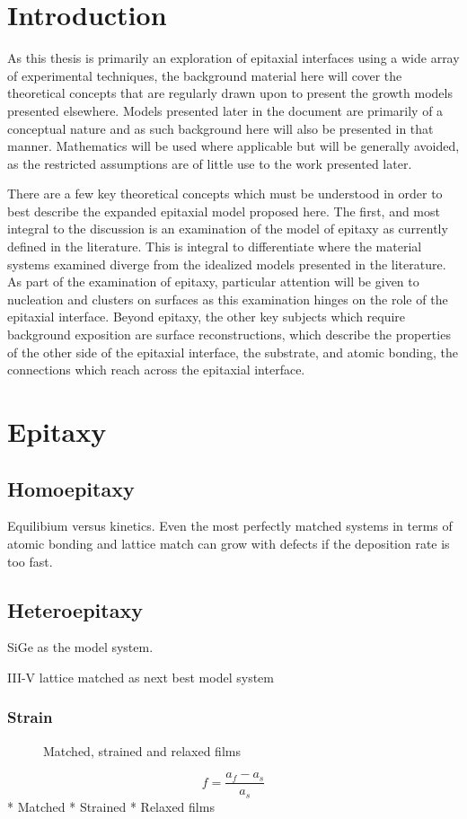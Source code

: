 \section{Introduction}
As this thesis is primarily an exploration of epitaxial interfaces using a wide array of experimental techniques, the background material here will cover the theoretical concepts that are regularly drawn upon to present the growth models presented elsewhere. Models presented later in the document are primarily of a conceptual nature and as such background here will also be presented in that manner. Mathematics will be used where applicable but will be generally avoided, as the restricted assumptions are of little use to the work presented later.

There are a few key theoretical concepts which must be understood in order to best describe the expanded epitaxial model proposed here. The first, and most integral to the discussion is an examination of the model of epitaxy as currently defined in the literature. This is integral to differentiate where the material systems examined diverge from the idealized models presented in the literature. As part of the examination of epitaxy, particular attention will be given to nucleation and clusters on surfaces as this examination hinges on the role of the epitaxial interface. Beyond epitaxy, the other key subjects which require background exposition are surface reconstructions, which describe the properties of the other side of the epitaxial interface, the substrate, and atomic bonding, the connections which reach across the epitaxial interface.

\section{Epitaxy}
\subsection{Homoepitaxy}
Equilibium versus kinetics. Even the most perfectly matched systems in terms of atomic bonding and lattice match can grow with defects if the deposition rate is too fast.

\subsection{Heteroepitaxy}
SiGe as the model system.



III-V lattice matched as next best model system
\subsubsection{Strain}
\begin{figure}
    \centering
    \caption{\label{fig:back_strain}Matched, strained and relaxed films}
\end{figure}
\begin{equation}
f = \frac{a_f - a_s}{a_s}
\end{equation}
* Matched
* Strained
* Relaxed films

